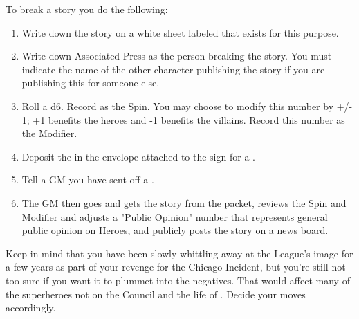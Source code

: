 \documentclass[green]{LRSguildcamp1}
\begin{document}
To break a story you do the following:
\begin{enumerate}
\item Write down the story on a white sheet labeled \wPressRelease{} that exists for this purpose. 

\item Write down Associated Press as the person breaking the story. You must indicate the name of the other character publishing the story if you are publishing this for someone else. 

\item Roll a d6. Record as the Spin. You may choose to modify this number by +/- 1; +1 benefits the heroes and -1 benefits the villains. Record this number as the Modifier. 

\item Deposit the \wPressRelease{} in the envelope attached to the sign for a \sWallPhone{}. 

\item Tell a GM you have sent off a \wPressRelease{}.

\item The GM then goes and gets the story from the packet, reviews the Spin and Modifier and adjusts a "Public Opinion" number that represents general public opinion on Heroes, and publicly posts the story on a news board. 
\end{enumerate}

Keep in mind that you have been slowly whittling away at the League's image for a few years as part of your revenge for the Chicago Incident, but you're still not too sure if you want it to plummet into the negatives. That would affect many of the superheroes not on the Council and the life of \cYoungest{}.  Decide your moves accordingly.
\end{document}
